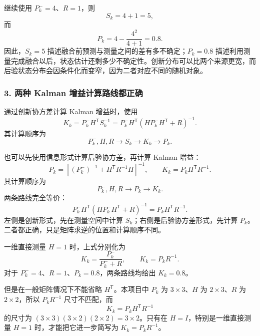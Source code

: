 \documentclass[UTF8,a4paper,11pt]{ctexart}
\newcommand{\prior}{^{-}}
\newcommand{\transpose}{^{\mathsf T}}
\begin{document}
继续使用 $P_k\prior=4$、$R=1$，则
\begin{equation}
S_k=4+1=5,
\end{equation}
而
\begin{equation}
P_k
=4-\frac{4^2}{4+1}
=0.8.
\end{equation}
因此，$S_k=5$ 描述融合前预测与测量之间的差有多不确定；$P_k=0.8$ 描述利用测量完成融合以后，状态估计还剩多少不确定性。创新分布可以比两个来源更宽，而后验状态分布会因条件化而变窄，因为二者对应不同的随机对象。

\subsubsection*{3. 两种 Kalman 增益计算路线都正确}

通过创新协方差计算 Kalman 增益时，使用
\begin{equation}
\boxed{
K_k
=P_k\prior H\transpose S_k^{-1}
=P_k\prior H\transpose
\left(HP_k\prior H\transpose+R\right)^{-1}
}.
\end{equation}
其计算顺序为
\begin{equation}
P_k\prior,H,R
\longrightarrow S_k
\longrightarrow K_k
\longrightarrow P_k.
\end{equation}

也可以先使用信息形式计算后验协方差，再计算 Kalman 增益：
\begin{equation}
\boxed{
P_k
=\left[(P_k\prior)^{-1}+H\transpose R^{-1}H\right]^{-1},
\qquad
K_k=P_kH\transpose R^{-1}
}.
\end{equation}
其计算顺序为
\begin{equation}
P_k\prior,H,R
\longrightarrow P_k
\longrightarrow K_k.
\end{equation}
两条路线完全等价：
\begin{equation}
\boxed{
P_k\prior H\transpose
\left(HP_k\prior H\transpose+R\right)^{-1}
=P_kH\transpose R^{-1}
}.
\end{equation}
左侧是创新形式，先在测量空间中计算 $S_k$；右侧是后验协方差形式，先计算 $P_k$。二者都正确，只是矩阵求逆的位置和计算顺序不同。

一维直接测量 $H=1$ 时，上式分别化为
\begin{equation}
K_k=\frac{P_k\prior}{P_k\prior+R},
\qquad
K_k=P_kR^{-1}.
\end{equation}
对于 $P_k\prior=4$、$R=1$、$P_k=0.8$，两条路线均给出 $K_k=0.8$。

但是在一般矩阵情况下不能省略 $H\transpose$。本项目中 $P_k$ 为 $3\times3$、$H$ 为 $2\times3$、$R$ 为 $2\times2$，所以 $P_kR^{-1}$ 尺寸不匹配，而
\begin{equation}
K_k=P_kH\transpose R^{-1}
\end{equation}
的尺寸为 $(3\times3)(3\times2)(2\times2)=3\times2$。只有在 $H=I$，特别是一维直接测量 $H=1$ 时，才能把它进一步简写为 $K_k=P_kR^{-1}$。
\end{document}

